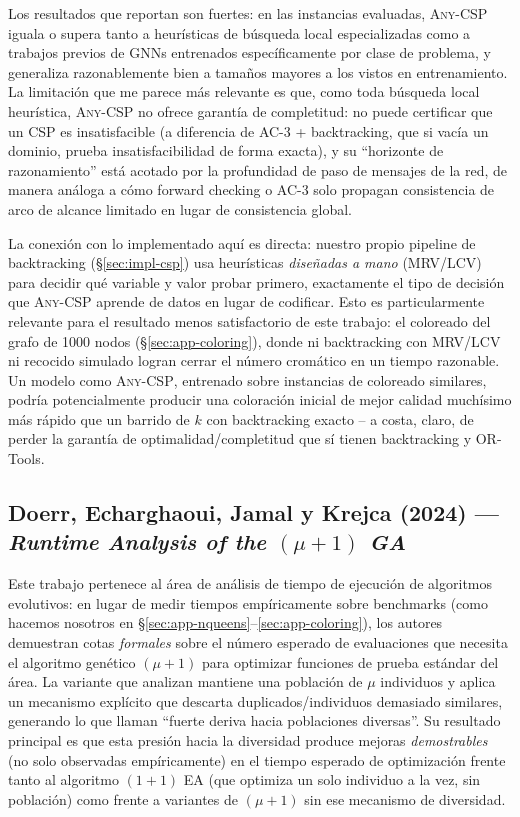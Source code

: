 \documentclass[11pt,onecolumn,letterpaper]{article}
\begin{document}
Los resultados que reportan son fuertes: en las instancias evaluadas, \textsc{Any-CSP}
iguala o supera tanto a heur\'isticas de b\'usqueda local especializadas como a trabajos
previos de GNNs entrenados espec\'ificamente por clase de problema, y generaliza
razonablemente bien a tama\~nos mayores a los vistos en entrenamiento. La limitaci\'on que
me parece m\'as relevante es que, como toda b\'usqueda local heur\'istica, \textsc{Any-CSP}
no ofrece garant\'ia de completitud: no puede certificar que un CSP es insatisfacible (a
diferencia de AC-3 + backtracking, que si vac\'ia un dominio, prueba insatisfacibilidad de
forma exacta), y su ``horizonte de razonamiento'' est\'a acotado por la profundidad de
paso de mensajes de la red, de manera an\'aloga a c\'omo forward checking o AC-3 solo
propagan consistencia de arco de alcance limitado en lugar de consistencia global.

La conexi\'on con lo implementado aqu\'i es directa: nuestro propio pipeline de
backtracking (\S\ref{sec:impl-csp}) usa heur\'isticas \emph{dise\~nadas a mano}
(MRV/LCV) para decidir qu\'e variable y valor probar primero, exactamente el tipo de
decisi\'on que \textsc{Any-CSP} aprende de datos en lugar de codificar. Esto es
particularmente relevante para el resultado menos satisfactorio de este trabajo: el
coloreado del grafo de 1000 nodos (\S\ref{sec:app-coloring}), donde ni backtracking con
MRV/LCV ni recocido simulado logran cerrar el n\'umero crom\'atico en un tiempo razonable.
Un modelo como \textsc{Any-CSP}, entrenado sobre instancias de coloreado similares,
podr\'ia potencialmente producir una coloraci\'on inicial de mejor calidad much\'isimo m\'as
r\'apido que un barrido de $k$ con backtracking exacto -- a costa, claro, de perder la
garant\'ia de optimalidad/completitud que s\'i tienen backtracking y OR-Tools.

\subsection{Doerr, Echarghaoui, Jamal y Krejca (2024) --- \emph{Runtime Analysis of the $(\mu+1)$ GA}~\cite{doerr2024runtime}}
\label{sec:readings-doerr}

Este trabajo pertenece al \'area de an\'alisis de tiempo de ejecuci\'on de algoritmos
evolutivos: en lugar de medir tiempos emp\'iricamente sobre benchmarks (como hacemos
nosotros en \S\ref{sec:app-nqueens}--\ref{sec:app-coloring}), los autores demuestran cotas
\emph{formales} sobre el n\'umero esperado de evaluaciones que necesita el algoritmo
gen\'etico $(\mu+1)$ para optimizar funciones de prueba est\'andar del \'area. La variante
que analizan mantiene una poblaci\'on de $\mu$ individuos y aplica un mecanismo expl\'icito
que descarta duplicados/individuos demasiado similares, generando lo que llaman ``fuerte
deriva hacia poblaciones diversas''. Su resultado principal es que esta presi\'on hacia la
diversidad produce mejoras \emph{demostrables} (no solo observadas emp\'iricamente) en el
tiempo esperado de optimizaci\'on frente tanto al algoritmo $(1+1)$ EA (que optimiza un
solo individuo a la vez, sin poblaci\'on) como frente a variantes de $(\mu+1)$ sin ese
mecanismo de diversidad.
\end{document}
